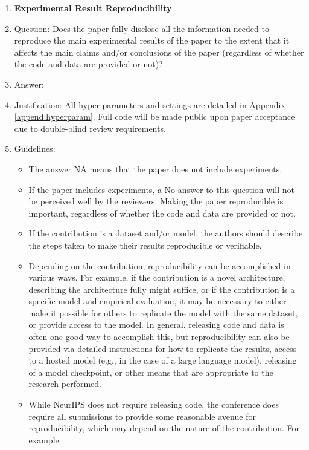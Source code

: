 \documentclass{article}
\theoremstyle{plain}
\theoremstyle{definition}
\theoremstyle{remark}
\begin{document}
\begin{enumerate}
    \item {\bf Experimental Result Reproducibility}
    \item[] Question: Does the paper fully disclose all the information needed to reproduce the main experimental results of the paper to the extent that it affects the main claims and/or conclusions of the paper (regardless of whether the code and data are provided or not)?
    \item[] Answer: \answerYes{} %
    \item[] Justification: All hyper-parameters and settings are detailed in Appendix \ref{append:hyperparam}. Full code will be made public upon paper acceptance due to double-blind review requirements.
    \item[] Guidelines:
    \begin{itemize}
        \item The answer NA means that the paper does not include experiments.
        \item If the paper includes experiments, a No answer to this question will not be perceived well by the reviewers: Making the paper reproducible is important, regardless of whether the code and data are provided or not.
        \item If the contribution is a dataset and/or model, the authors should describe the steps taken to make their results reproducible or verifiable. 
        \item Depending on the contribution, reproducibility can be accomplished in various ways. For example, if the contribution is a novel architecture, describing the architecture fully might suffice, or if the contribution is a specific model and empirical evaluation, it may be necessary to either make it possible for others to replicate the model with the same dataset, or provide access to the model. In general. releasing code and data is often one good way to accomplish this, but reproducibility can also be provided via detailed instructions for how to replicate the results, access to a hosted model (e.g., in the case of a large language model), releasing of a model checkpoint, or other means that are appropriate to the research performed.
        \item While NeurIPS does not require releasing code, the conference does require all submissions to provide some reasonable avenue for reproducibility, which may depend on the nature of the contribution. For example
        \begin{enumerate}

\end{enumerate}
\end{itemize}
\end{enumerate}
\end{document}
